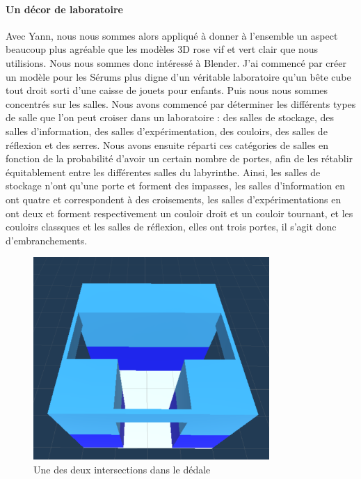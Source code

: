 \documentclass{article}
\begin{document}
\paragraph{Un décor de laboratoire}
Avec Yann, nous nous sommes alors appliqué à donner à l'ensemble un aspect beaucoup plus agréable que les modèles 3D rose vif et vert clair que nous utilisions. Nous nous sommes donc intéressé à Blender. J'ai commencé par créer un modèle pour les Sérums plus digne d'un véritable laboratoire qu'un bête cube tout droit sorti d'une caisse de jouets pour enfants. Puis nous nous sommes concentrés sur les salles. Nous avons commencé par déterminer les différents types de salle que l'on peut croiser dans un laboratoire : des salles de stockage, des salles d'information, des salles d'expérimentation, des couloirs, des salles de réflexion et des serres. Nous avons ensuite réparti ces catégories de salles en fonction de la probabilité d'avoir un certain nombre de portes, afin de les rétablir équitablement entre les différentes salles du labyrinthe. Ainsi, les salles de stockage n'ont qu'une porte et forment des impasses, les salles d'information en ont quatre et correspondent à des croisements, les salles d'expérimentations en ont deux et forment respectivement un couloir droit et un couloir tournant, et les couloirs classques et les salles de réflexion, elles ont trois portes, il s'agit donc d'embranchements.

\begin{figure}[H]
    \centering
    \includegraphics[width=0.8\textwidth]{Bifurc.png}
    \caption{Une des deux intersections dans le dédale}
    \label{Une des deux intersections dans le dédale}
\end{figure}
\end{document}
